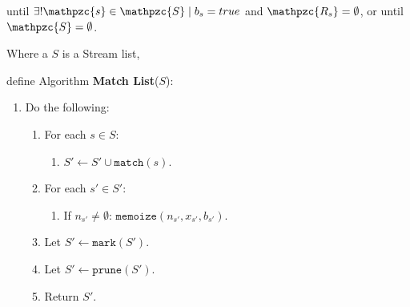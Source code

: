 \begin{framed}
   \indent
   until $\exists! \mathpzc{s} \in \mathpzc{S} \mid b_s=true$ and $\mathpzc{R_s} = \emptyset$, or 
   until $\mathpzc{S} = \emptyset$. 

 \end{framed}


 \begin{framed}

  Where a $S$ is a Stream list, 

  \vspace{12pt}

  define Algorithm \textbf{Match List}($S$):
 
  \begin{enumerate}

   \item Do the following:

   \begin{enumerate}

     \item For each $s \in S$:
     \begin{enumerate}
       \item $S' \leftarrow S' \cup \texttt{match}(s)$.
     \end{enumerate} 

     \item For each $s' \in S'$: 
     \begin{enumerate} 
       \item If $n_{s'} \not= \emptyset$: $\texttt{memoize}(n_{s'}, x_{s'}, b_{s'})$.
     \end{enumerate} 
     \item Let $S' \leftarrow \texttt{mark}(S')$.
     \item Let $S' \leftarrow \texttt{prune}(S')$.
     \item Return $S'$.
   \end{enumerate} 

  \end{enumerate}

 \end{framed}

